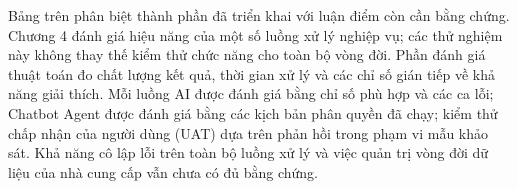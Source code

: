 Bảng trên phân biệt thành phần đã triển khai với luận điểm còn cần bằng chứng. Chương 4 đánh giá hiệu năng của một số luồng xử lý nghiệp vụ; các thử nghiệm này không thay thế kiểm thử chức năng cho toàn bộ vòng đời. Phần đánh giá thuật toán đo chất lượng kết quả, thời gian xử lý và các chỉ số gián tiếp về khả năng giải thích. Mỗi luồng AI được đánh giá bằng chỉ số phù hợp và các ca lỗi; Chatbot Agent được đánh giá bằng các kịch bản phân quyền đã chạy; kiểm thử chấp nhận của người dùng (UAT) dựa trên phản hồi trong phạm vi mẫu khảo sát. Khả năng cô lập lỗi trên toàn bộ luồng xử lý và việc quản trị vòng đời dữ liệu của nhà cung cấp vẫn chưa có đủ bằng chứng.

\fi